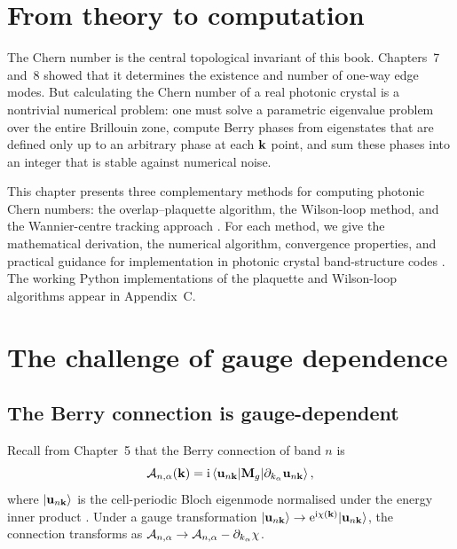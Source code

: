 
\section{From theory to computation}
\label{sec:ch10-intro}

The Chern number is the central topological invariant of this book.
Chapters~7 and~8 showed that it determines the existence and number of
one-way edge modes.  But calculating the Chern number of a real photonic
crystal is a nontrivial numerical problem: one must solve a parametric
eigenvalue problem over the entire Brillouin zone, compute Berry phases
from eigenstates that are defined only up to an arbitrary phase at each
$\mathbf{k}$ point, and sum these phases into an integer that is stable
against numerical noise.

This chapter presents three complementary methods for computing
photonic Chern numbers: the overlap--plaquette algorithm, the
Wilson-loop method, and the Wannier-centre tracking approach
\cite{lu2026universal,raghu2008analogs}.
For each method, we give the mathematical derivation, the numerical
algorithm, convergence properties, and practical guidance for
implementation in photonic crystal band-structure codes
\cite{lee2022calculation,wu2015scheme}.  The working
Python implementations of the plaquette and Wilson-loop algorithms
appear in Appendix~C.

\section{The challenge of gauge dependence}
\label{sec:ch10-gauge}

\subsection{The Berry connection is gauge-dependent}
\label{sec:ch10-gauge-connection}

Recall from Chapter~5 that the Berry connection of band $n$ is
\begin{equation}\label{eq:ch10-berry-connection}
  \mathcal{A}_{n,\alpha}(\mathbf{k})
  = \mathrm{i}\,\langle\mathbf{u}_{n\mathbf{k}}|\mathbf{M}_g|\partial_{k_\alpha}
  \mathbf{u}_{n\mathbf{k}}\rangle\,,
\end{equation}
where $|\mathbf{u}_{n\mathbf{k}}\rangle$ is the cell-periodic Bloch
eigenmode normalised under the energy inner product
\cite{gangaraj2016berry,thouless1982quantized}.  Under a gauge
transformation $|\mathbf{u}_{n\mathbf{k}}\rangle\to\mathrm{e}^{\mathrm{i}\chi(\mathbf{k})}
|\mathbf{u}_{n\mathbf{k}}\rangle$, the connection transforms as
$\mathcal{A}_{n,\alpha}\to\mathcal{A}_{n,\alpha}-\partial_{k_\alpha}\chi$.


